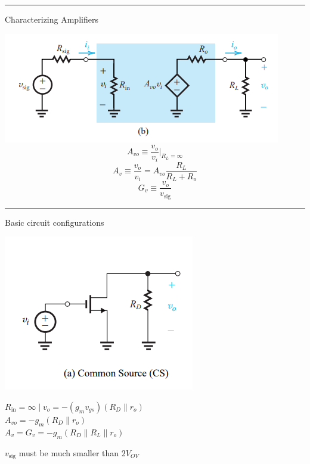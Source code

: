\documentclass[a4paper]{article}
\begin{document}
\begin{multicols*}{3}
\columnbreak

\hrule
\vspace{1mm}
Characterizing Amplifiers

\includegraphics[width=\linewidth]{imgs/amplifier_model.png}
$$A_{vo} \equiv \frac{v_o}{v_i} \Big|_{R_L=\infty}$$
$$A_v \equiv \frac{v_o}{v_i} = A_{vo} \frac{R_L}{R_L + R_o}$$
$$G_v \equiv \frac{v_o}{v_\text{sig}}$$
    
\hrule
\vspace{1mm}
Basic circuit configurations

\includegraphics[width=0.8\linewidth]{imgs/common_source.png}

$R_{\text{in}}=\infty \mid v_o=-(g_mv_{gs})(R_D \parallel r_o)$\\
$A_{vo}=-g_m(R_D \parallel r_o)$\\
$A_v = G_v =-g_m(R_D \parallel R_L \parallel r_o)$

$v_{\text{sig}}$ must be much smaller than $2V_{OV}$


\end{multicols*}
\end{document}
